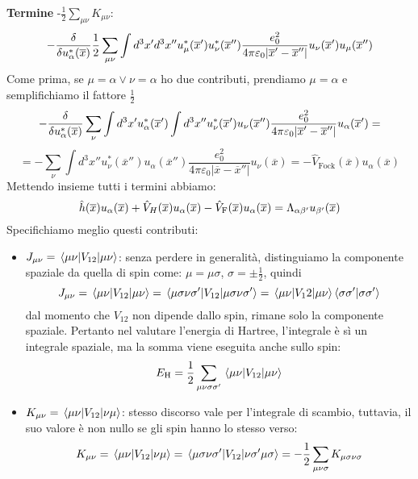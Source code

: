 \textbf{Termine} -$\frac 12\sum_{\mu\nu}K_{\mu\nu}$:
\begin{equation*}
    -\functionalderivative{u_\alpha^*(\overline x)}\frac 12 \sum_{\mu\nu}\int d^3x' d^3x''u_\mu^*(\overline{x}')u_\nu^*(\overline{x}'')\frac{e_0^2}{4\pi\varepsilon_0|\overline{x}'-\overline{x}''|}u_\nu({\overline{x}'})u_\mu(\overline{x}'')
\end{equation*}
Come prima, se $\mu=\alpha \vee \nu=\alpha$ ho due contributi, prendiamo $\mu=\alpha$ e semplifichiamo il fattore $\frac 12$
\begin{equation*}
    - \functionalderivative{u_\alpha^*(\overline x)} \sum_{\nu}\int d^3x' u_{\alpha}^*(\overline{x}')\int d^3x''u_\nu^*(\overline{x}')u_\nu(\overline{x}'')\frac{e_0^2}{4\pi\varepsilon_0|\overline{x}'-\overline{x}''|}u_\alpha(\overline{x}') =
\end{equation*}
\begin{equation*}
    = -\sum_\nu \int d^3x''u_\nu^*(\overline{x}'')u_\alpha(\overline{x}'')\frac{e_0^2}{4\pi\varepsilon_0|\overline{x}-\overline{x}''|}u_\nu(\overline{x})=-\hat V_{\text{Fock}}(\overline x)u_\alpha(\overline x)
\end{equation*}
Mettendo insieme tutti i termini abbiamo:
\begin{equation*}
    \hat h(\overline x) u_\alpha(\overline x)+\hat V_H(\overline x)u_\alpha(\overline x)-\hat V_{\text F}(\overline x) u_\alpha(\overline x) = \Lambda_{\alpha\beta'}u_{\beta'}(\overline x)
\end{equation*}
Specifichiamo meglio questi contributi:
\begin{itemize}
    \item $J_{\mu\nu}=\mel{\mu\nu}{V_{12}}{\mu\nu}$: senza perdere in generalità, distinguiamo la componente spaziale da quella di spin come: $\mu=\mu\sigma$, $\sigma=\pm\frac 12$, quindi
    \begin{equation*}
        J_{\mu\nu}=\mel{\mu\nu}{V_{12}}{\mu\nu}=\mel{\mu\sigma\nu\sigma'}{V_{12}}{\mu\sigma\nu\sigma'}=\mel{\mu\nu}{V_12}{\mu\nu}\ip{\sigma\sigma'}{\sigma\sigma'}
    \end{equation*}
    dal momento che $V_{12}$ non dipende dallo spin, rimane solo la componente spaziale. Pertanto nel valutare l'energia di Hartree, l'integrale è sì un integrale spaziale, ma la somma viene eseguita anche sullo spin:
    \begin{equation*}
        E_{\text H}=\frac 12\sum_{\mu\nu\sigma\sigma'}\mel{\mu\nu}{V_{12}}{\mu\nu}
    \end{equation*}
    \item $K_{\mu\nu}=\mel{\mu\nu}{V_{12}}{\nu\mu}$: stesso discorso vale per l'integrale di scambio, tuttavia, il suo valore è non nullo se gli spin hanno lo stesso verso:
    \begin{equation*}
        K_{\mu\nu}=\mel{\mu\nu}{V_{12}}{\nu\mu}=\mel{\mu\sigma\nu\sigma'}{V_{12}}{\nu\sigma'\mu\sigma}=-\frac 12 \sum_{\mu\nu\sigma}K_{\mu\sigma\nu\sigma}
    \end{equation*}
\end{itemize}
